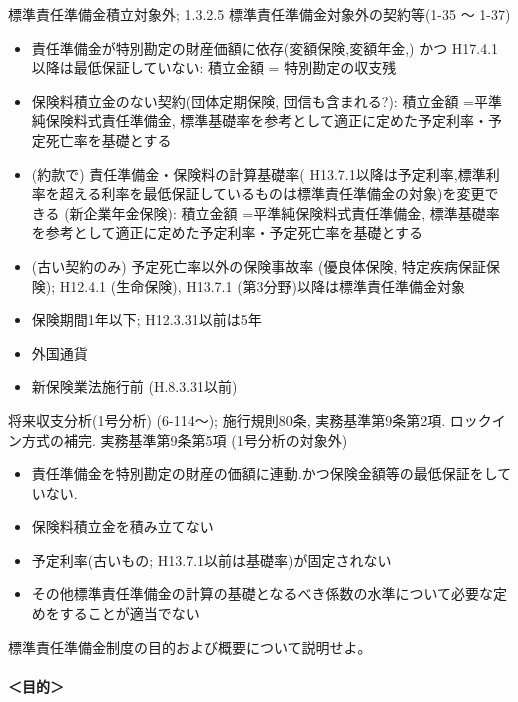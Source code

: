 \documentclass[report,gutter=10mm,fore-edge=10mm,uplatex,dvipdfmx]{jlreq}
\begin{document}
標準責任準備金積立対象外; 1.3.2.5 標準責任準備金対象外の契約等(1-35 〜 1-37)
\begin{itemize}
 \item 責任準備金が特別勘定の財産価額に依存(変額保険,変額年金,) かつ H17.4.1以降は最低保証していない: 積立金額 = 特別勘定の収支残
 \item 保険料積立金のない契約(団体定期保険, 団信も含まれる?): 積立金額 =平準純保険料式責任準備金, 標準基礎率を参考として適正に定めた予定利率・予定死亡率を基礎とする
 \item  (約款で) 責任準備金・保険料の計算基礎率( H13.7.1以降は予定利率,標準利率を超える利率を最低保証しているものは標準責任準備金の対象)を変更できる (新企業年金保険): 積立金額 =平準純保険料式責任準備金, 標準基礎率を参考として適正に定めた予定利率・予定死亡率を基礎とする
 \item (古い契約のみ) 予定死亡率以外の保険事故率 (優良体保険, 特定疾病保証保険); H12.4.1 (生命保険), H13.7.1 (第3分野)以降は標準責任準備金対象
 \item 保険期間1年以下; H12.3.31以前は5年
 \item 外国通貨
 \item 新保険業法施行前 (H.8.3.31以前)
\end{itemize}

将来収支分析(1号分析) (6-114〜); 施行規則80条, 実務基準第9条第2項. ロックイン方式の補完. 
実務基準第9条第5項 (1号分析の対象外)

\begin{itemize}
 \item 責任準備金を特別勘定の財産の価額に連動.かつ保険金額等の最低保証をしていない. 
 \item 保険料積立金を積み立てない
 \item 予定利率(古いもの; H13.7.1以前は基礎率)が固定されない
 \item その他標準責任準備金の計算の基礎となるべき係数の水準について必要な定めをすることが適当でない
\end{itemize}


標準責任準備金制度の目的および概要について説明せよ。


\paragraph{＜目的＞}
\end{document}
